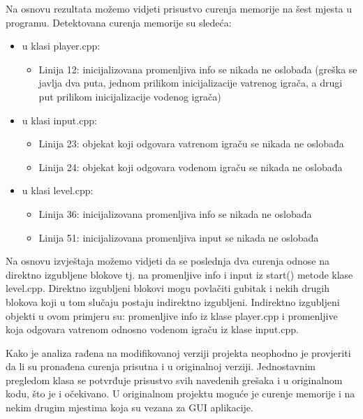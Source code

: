 \documentclass[a4paper]{article}
\begin{document}
Na osnovu rezultata možemo vidjeti prisustvo curenja memorije na šest mjesta u programu. Detektovana curenja memorije su sledeća:
\begin{itemize}
	\item {u klasi player.cpp:
	\begin{itemize}
		\item Linija 12: inicijalizovana promenljiva info se nikada ne oslobađa (greška se javlja dva puta, jednom prilikom inicijalizacije vatrenog igrača, a drugi put prilikom inicijalizacije vodenog igrača)
	\end{itemize}}
	
	\item {u klasi input.cpp:
	\begin{itemize}
		\item Linija 23: objekat koji odgovara vatrenom igraču se nikada ne oslobađa
		\item Linija 24: objekat koji odgovara vodenom igraču se nikada ne oslobađa
	\end{itemize}}
	
	\item {u klasi level.cpp:
	\begin{itemize}
		\item Linija 36: inicijalizovana promenljiva info se nikada ne oslobađa
		\item Linija 51: inicijalizovana promenljiva input se nikada ne oslobađa
	\end{itemize}}
\end{itemize}
Na osnovu izvještaja možemo vidjeti da se poslednja dva curenja odnose na direktno izgubljene blokove tj. na promenljive info i input iz start() metode klase level.cpp. Direktno izgubljeni blokovi mogu povlačiti gubitak i nekih drugih blokova koji u tom slučaju postaju indirektno izgubljeni. Indirektno izgubljeni objekti u ovom primjeru su: promenljive info iz klase player.cpp i promenljive koja odgovara vatrenom odnosno vodenom igraču iz klase input.cpp.

Kako je analiza rađena na modifikovanoj verziji projekta neophodno je provjeriti da li su pronađena curenja prisutna i u originalnoj verziji. Jednostavnim pregledom klasa se potvrđuje prisustvo svih navedenih grešaka i u originalnom kodu, što je i očekivano.
U originalnom projektu moguće je curenje memorije i na nekim drugim mjestima koja su vezana za GUI aplikacije.
\end{document}
